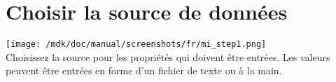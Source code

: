 \section{Choisir la source de donn\'ees}
\texttt{[image: /mdk/doc/manual/screenshots/fr/mi\_step1.png]} \\
Choisissez la source pour les propri\'et\'es qui doivent \^etre entr\'ees. Les valeurs peuvent \^etre entr\'ees en forme d'un fichier de texte ou \`a la main.\\
